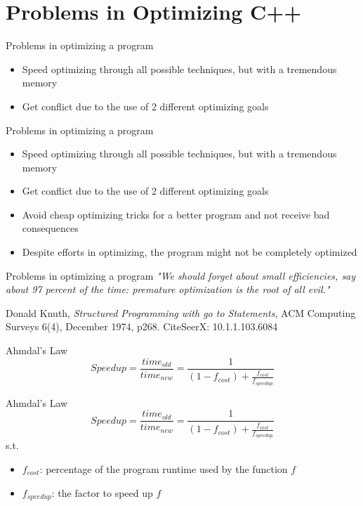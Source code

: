 \documentclass[aspectratio=169,xcolor=dvipsnames]{beamer}
\begin{document}
\section{Problems in Optimizing C++}    
\begin{frame}{Problems in optimizing a program}
\begin{itemize}
    \item Speed optimizing through all possible techniques, but with a tremendous memory
    \item Get conflict due to the use of 2 different optimizing goals 
\end{itemize}
\end{frame}
\begin{frame}{Problems in optimizing a program}
\begin{itemize}
    \item Speed optimizing through all possible techniques, but with a tremendous memory
    \item Get conflict due to the use of 2 different optimizing goals 
    \item Avoid cheap optimizing tricks for a better program and not receive bad consequences
    \item Despite efforts in optimizing, the program might not be completely optimized
\end{itemize}
\end{frame}
\begin{frame}{Problems in optimizing a program}
        \textit{"We should forget about small efficiencies, say about 97 percent of the time: premature optimization is the root of all evil."}
    \begin{flushright}
    \small Donald Knuth, \textit{Structured Programming with go to Statements}, ACM Computing Surveys 6(4), December 1974, p268. CiteSeerX: 10.1.1.103.6084
    \end{flushright}
\end{frame}

\begin{frame}{Ahmdal's Law}
    \begin{equation*}
        Speedup = \frac{time_{old}}{time_{new}} = \frac{1}{\left(1 - f_{cost}\right) + \frac{f_{cost}}{{f_{speedup}}}}
    \end{equation*}
\end{frame}

\begin{frame}{Ahmdal's Law}
    \begin{equation*}
        Speedup = \frac{time_{old}}{time_{new}} = \frac{1}{\left(1 - f_{cost}\right) + \frac{f_{cost}}{{f_{speedup}}}}
    \end{equation*}
s.t. 
\begin{itemize}
    \item $f_{cost}$: percentage of the program runtime used by the function $f$
    \item $f_{speedup}$: the factor to speed up $f$
\end{itemize}
\end{frame}
\end{document}
